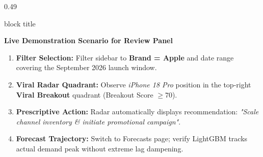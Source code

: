 \documentclass[aspectratio=169, 10pt]{beamer}
\newenvironment{highlightcard}[1][]{%
        \begin{beamercolorbox}[rounded=true,shadow=false,wd=\linewidth,sep=3.5pt,#1]{block title}%
        \fontsize{7.8pt}{9.8pt}\selectfont%
    }{%
        \end{beamercolorbox}%
    }
\begin{document}
\begin{frame}[t]
\begin{columns}[T]
            \begin{column}{0.49\textwidth}                                                                                                                                                             
                \begin{highlightcard}                                                                                                                                                                  
                    \textbf{\color{NavyPrimary}Live Demonstration Scenario for Review Panel}\\[0.03cm]                                                                                                 
                    \begin{enumerate}\setlength{\itemsep}{1.2pt}                                                                                                                                       
                        \item \textbf{Filter Selection:} Filter sidebar to \textbf{Brand = Apple} and date range covering the September 2026 launch window.                                            
                        \item \textbf{Viral Radar Quadrant:} Observe \textit{iPhone 18 Pro} position in the top-right \textbf{Viral Breakout} quadrant (Breakout Score $\ge 70$).                      
                        \item \textbf{Prescriptive Action:} Radar automatically displays recommendation: \textit{"Scale channel inventory \& initiate promotional campaign"}.                          
                        \item \textbf{Forecast Trajectory:} Switch to Forecasts page; verify LightGBM tracks actual demand peak without extreme lag dampening.                                         
                    \end{enumerate}                                                                                                                                                                    
                \end{highlightcard}                                                                                                                                                                    
                \vspace{0.14cm}                                                                                                                                                                        

\end{column}
\end{columns}
\end{frame}
\end{document}
